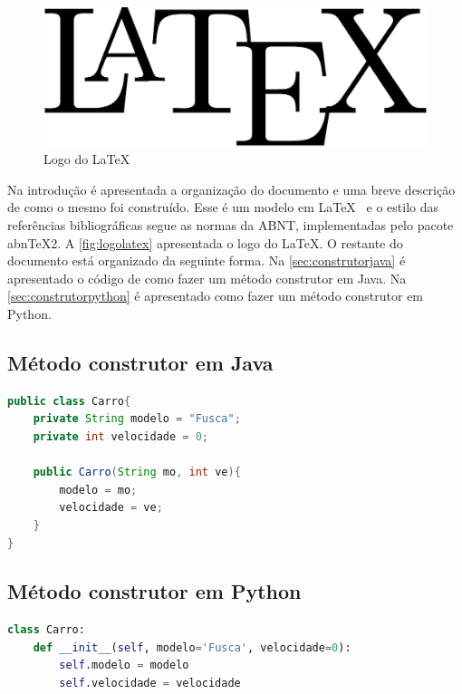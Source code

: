 \documentclass[11pt]{../../classes/univaliarticle}
\begin{document}
\lipsum[1]

\begin{figure}[ht]
    \centering
    \includegraphics[width=.3\linewidth]{figuras/latex-logo}
    \caption{Logo do \LaTeX}
    \label{fig:logolatex}
\end{figure}

Na introdução é apresentada a organização do documento e uma breve descrição de como o mesmo foi construído.   Esse é um modelo em \LaTeX~ \cite{lamport94} e o estilo das referências bibliográficas segue as normas da ABNT, implementadas pelo pacote abnTeX2. A \autoref{fig:logolatex} apresentada o logo do \LaTeX. O restante do documento está organizado da seguinte forma. Na \autoref{sec:construtorjava} é apresentado o código de como fazer um método construtor em Java. Na \autoref{sec:construtorpython} é apresentado como fazer um método construtor em Python.

\subsection{Método construtor em Java}
\label{sec:construtorjava}


\begin{lstlisting}[language=java]
public class Carro{
    private String modelo = "Fusca";
    private int velocidade = 0;
    
    public Carro(String mo, int ve){
        modelo = mo;
        velocidade = ve;
    }
}
\end{lstlisting}


\subsection{Método construtor em Python}
\label{sec:construtorpython}


\begin{lstlisting}[language=python]
class Carro:
    def __init__(self, modelo='Fusca', velocidade=0):
        self.modelo = modelo
        self.velocidade = velocidade
\end{lstlisting}







\end{document}
